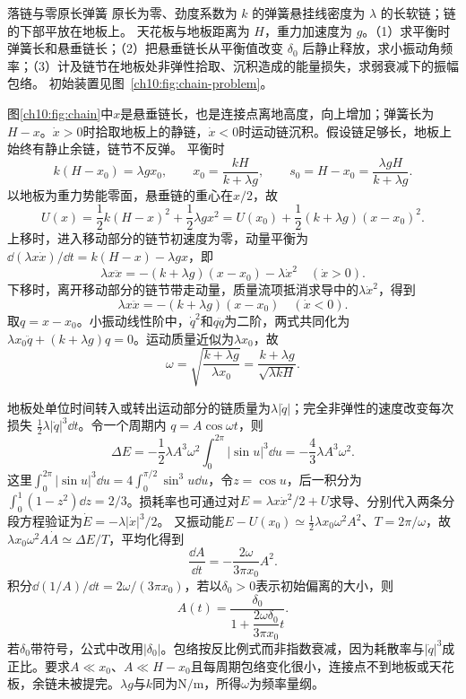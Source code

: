 \begin{origexamplebox}{落链与零原长弹簧}\label{ch10:ex:chain}
原长为零、劲度系数为 $k$ 的弹簧悬挂线密度为 $\lambda$ 的长软链；链的下部平放在地板上。
天花板与地板距离为 $H$，重力加速度为 $g$。（1）求平衡时弹簧长和悬垂链长；（2）把悬垂链长从平衡值改变
$\delta_0$ 后静止释放，求小振动角频率；（3）计及链节在地板处非弹性拾取、沉积造成的能量损失，求弱衰减下的振幅包络。
初始装置见图~\ref{ch10:fig:chain-problem}。
\chTenChainProblemFigure
\end{origexamplebox}
\begin{xesolution}
图\ref{ch10:fig:chain}中$x$是悬垂链长，也是连接点离地高度，向上增加；弹簧长为$H-x$。$\dot x>0$时拾取地板上的静链，$\dot x<0$时运动链沉积。假设链足够长，地板上始终有静止余链，链节不反弹。
\chTenChainFigure
平衡时
\[
 k(H-x_0)=\lambda gx_0,\qquad
 \boxed{x_0=\frac{kH}{k+\lambda g}},\qquad
 \boxed{s_0=H-x_0=\frac{\lambda gH}{k+\lambda g}}.
\]
以地板为重力势能零面，悬垂链的重心在$x/2$，故
\[
 U(x)=\frac12k(H-x)^2+\frac12\lambda gx^2
 =U(x_0)+\frac12(k+\lambda g)(x-x_0)^2.
\]
上移时，进入移动部分的链节初速度为零，动量平衡为$\dd(\lambda x\dot x)/\dd t=k(H-x)-\lambda gx$，即
\[
 \lambda x\ddot x=-(k+\lambda g)(x-x_0)-\lambda\dot x^2\quad(\dot x>0).
\]
下移时，离开移动部分的链节带走动量，质量流项抵消求导中的$\lambda\dot x^2$，得到
\[
 \lambda x\ddot x=-(k+\lambda g)(x-x_0)\quad(\dot x<0).
\]
取$q=x-x_0$。小振动线性阶中，$\dot q^2$和$q\ddot q$为二阶，两式共同化为$\lambda x_0\ddot q+(k+\lambda g)q=0$。运动质量近似为$\lambda x_0$，故
\[
 \boxed{\omega=\sqrt{\frac{k+\lambda g}{\lambda x_0}}
 =\frac{k+\lambda g}{\sqrt{\lambda kH}}}.
\]

地板处单位时间转入或转出运动部分的链质量为$\lambda|\dot q|$；完全非弹性的速度改变每次损失
$\tfrac12\lambda|\dot q|^3\dd t$。令一个周期内 $q=A\cos\omega t$，则
\[
 \Delta E=-\frac12\lambda A^3\omega^2
 \int_0^{2\pi}|\sin u|^3\dd u
 =-\frac43\lambda A^3\omega^2.
\]
这里$\int_0^{2\pi}|\sin u|^3\dd u=4\int_0^{\pi/2}\sin^3u\dd u$，令$z=\cos u$，后一积分为$\int_0^1(1-z^2)\dd z=2/3$。损耗率也可通过对$E=\lambda x\dot x^2/2+U$求导、分别代入两条分段方程验证为$\dot E=-\lambda|\dot x|^3/2$。
又振动能$E-U(x_0)\simeq\tfrac12\lambda x_0\omega^2A^2$、$T=2\pi/\omega$，故$\lambda x_0\omega^2A\dot A\simeq\Delta E/T$，平均化得到
\[
 \frac{\dd A}{\dd t}=-\frac{2\omega}{3\pi x_0}A^2.
\]
积分$\dd(1/A)/\dd t=2\omega/(3\pi x_0)$，若以$\delta_0>0$表示初始偏离的大小，则
\[
 \boxed{A(t)=\frac{\delta_0}
 {1+\dfrac{2\omega\delta_0}{3\pi x_0}t}}.
\]
若$\delta_0$带符号，公式中改用$|\delta_0|$。包络按反比例式而非指数衰减，因为耗散率与$|\dot q|^3$成正比。要求$A\ll x_0$、$A\ll H-x_0$且每周期包络变化很小，连接点不到地板或天花板，余链未被提完。$\lambda g$与$k$同为$\mathrm{N/m}$，所得$\omega$为频率量纲。
\end{xesolution}

